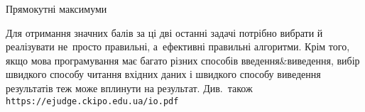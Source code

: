 \begin{problemAllDefault}{Прямокутні максимуми}
\begin{small}
\end{small}


\begin{footnotesize}

\Note
Для отримання значних балів за ці дві останні задачі потрібно вибрати й реалізувати не~просто правильні, а~ефективні правильні алгоритми. Крім того, якщо мова програмування має багато різних способів введення\&виведення, вибір швидкого способу читання вхідних даних і швидкого способу виведення результатів теж може вплинути на результат.
Див.~також \verb"https://ejudge.ckipo.edu.ua/io.pdf"

\end{footnotesize}





 
\end{problemAllDefault}
